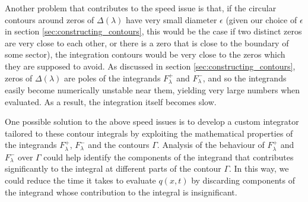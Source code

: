 \documentclass[12pt, oneside, a4paper]{article}
\begin{document}
Another problem that contributes to the speed issue is that, if the circular contours around zeros of $\Delta(\lambda)$ have very small diameter $\epsilon$ (given our choice of $\epsilon$ in section \ref{sec:constructing_contours}, this would be the case if two distinct zeros are very close to each other, or there is a zero that is close to the boundary of some sector), the integration contours would be very close to the zeros which they are supposed to avoid. As discussed in section \ref{sec:constructing_contours}, zeros of $\Delta(\lambda)$ are poles of the integrands $F^+_\lambda$ and $F^-_\lambda$, and so the integrands easily become numerically unstable near them, yielding very large numbers when evaluated. As a result, the integration itself becomes slow.

One possible solution to the above speed issues is to develop a custom integrator tailored to these contour integrals by exploiting the mathematical properties of the integrands $F^+_\lambda$, $F^-_\lambda$ and the contours $\Gamma$. Analysis of the behaviour of $F_\lambda^+$ and $F_\lambda^-$ over $\Gamma$ could help identify the components of the integrand that contributes significantly to the integral at different parts of the contour $\Gamma$. In this way, we could reduce the time it takes to evaluate $q(x,t)$ by discarding components of the integrand whose contribution to the integral is insignificant.

\newpage
{}

\newpage

% 

\end{document}
